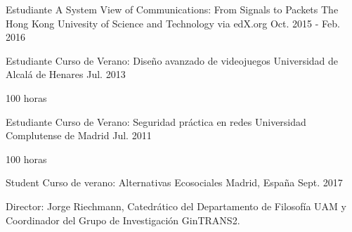 \begin{cventries}
  \cventry
    {Estudiante} %
    {A System View of Communications: From Signals to Packets} %
    {The Hong Kong Univesity of Science and Technology via edX.org} %
    {Oct. 2015 - Feb. 2016} %
    {
    }

  \cventry
    {Estudiante} %
    {Curso de Verano: Diseño avanzado de videojuegos} %
    {Universidad de Alcalá de Henares} %
    {Jul. 2013} %
    {
      \begin{cvitems} %
        \item {100 horas}
      \end{cvitems}
    }
    
  \cventry
    {Estudiante} %
    {Curso de Verano: Seguridad práctica en redes} %
    {Universidad Complutense de Madrid} %
    {Jul. 2011} %
    {
      \begin{cvitems} %
        \item {100 horas}
      \end{cvitems}
    }
    
  \cventry
    {Student} %
    {Curso de verano: Alternativas Ecosociales} %
    {Madrid, España} %
    {Sept. 2017} %
    {
      \begin{cvitems} %
        \item {Director: Jorge Riechmann, Catedrático del Departamento de Filosofía UAM y Coordinador del Grupo de Investigación GinTRANS2.}
      \end{cvitems}
    }

\end{cventries}

